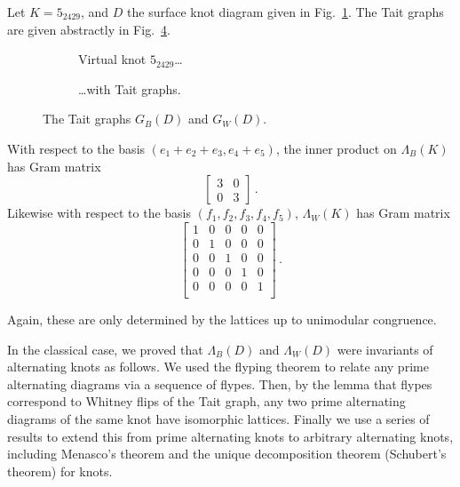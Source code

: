\documentclass[12pt]{report}
\begin{document}
Let $K = 5_{2429}$, and $D$ the surface knot diagram given in Fig.~\ref{fig:5-2429-vknot}. The Tait graphs are given abstractly in Fig.~\ref{fig:5-2429-taits-abstract}.

\begin{figure}[hbt]
	\hspace*{\fill}
	\begin{subfigure}[b]{0.45 \textwidth}
		\centering
		\def\svgscale{0.35}
		
		\caption{Virtual knot $5_{2429}$\ldots}
		\label{fig:5-2429-vknot}
	\end{subfigure}
	\hspace*{\fill}
	\begin{subfigure}[b]{0.45 \textwidth}
		\centering
		\def\svgscale{0.35}
		
		\caption{\ldots with Tait graphs.}
		\label{fig:5-2429-taits}
	\end{subfigure}
	\hspace*{\fill}
	\caption{}
	\label{fig:5-2429-example}
\end{figure}

\begin{figure}[hbt]
	\centering
	\def\svgscale{0.4}
	
	\caption{The Tait graphs $G_{B}(D)$ and $G_{W}(D)$.}
	\label{fig:5-2429-taits-abstract}
\end{figure}

With respect to the basis $(e_{1} + e_{2} + e_{3}, e_{4} + e_{5})$, the inner product on $\Lambda_{B}(K)$ has Gram matrix
\[\begin{bmatrix}
3 & 0 \\
0 & 3
\end{bmatrix}\,.\]
Likewise with respect to the basis $(f_{1}, f_{2}, f_{3}, f_{4}, f_{5})$, $\Lambda_{W}(K)$ has Gram matrix
\[\begin{bmatrix}
1 & 0 & 0 & 0 & 0\\
0 & 1 & 0 & 0 & 0\\
0 & 0 & 1 & 0 & 0\\
0 & 0 & 0 & 1 & 0\\
0 & 0 & 0 & 0 & 1\\
\end{bmatrix}\,.\]

Again, these are only determined by the lattices up to unimodular congruence.

In the classical case, we proved that $\Lambda_{B}(D)$ and $\Lambda_{W}(D)$ were invariants of alternating knots as follows. We used the flyping theorem to relate any prime alternating diagrams via a sequence of flypes. Then, by the lemma that flypes correspond to Whitney flips of the Tait graph, any two prime alternating diagrams of the same knot have isomorphic lattices. Finally we use a series of results to extend this from prime alternating knots to arbitrary alternating knots, including Menasco's theorem and the unique decomposition theorem (Schubert's theorem) for knots.
\end{document}
